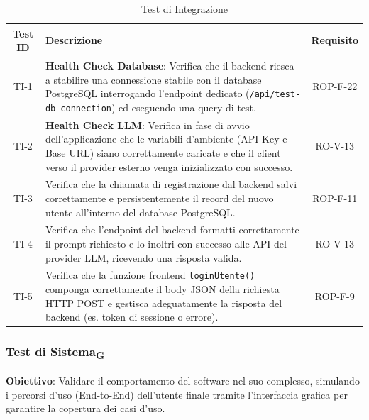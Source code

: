 \documentclass[11pt,a4paper]{article}
\begin{document}
\begin{table}[H]
    \centering
    \small
    \begin{tabularx}{\textwidth}{|c|X|c|}
        \hline
        \textbf{Test ID} & \textbf{Descrizione} & \textbf{Requisito} \\
        \hline
        TI-1 & \textbf{Health Check Database}: Verifica che il backend riesca a stabilire una connessione stabile con il database PostgreSQL interrogando l'endpoint dedicato (\texttt{/api/test-db-connection}) ed eseguendo una query di test. & ROP-F-22 \\
        \hline
        TI-2 & \textbf{Health Check LLM}: Verifica in fase di avvio dell'applicazione che le variabili d'ambiente (API Key e Base URL) siano correttamente caricate e che il client verso il provider esterno venga inizializzato con successo. & RO-V-13 \\
        \hline
        TI-3 & Verifica che la chiamata di registrazione dal backend salvi correttamente e persistentemente il record del nuovo utente all'interno del database PostgreSQL. & ROP-F-11 \\
        \hline
        TI-4 & Verifica che l'endpoint del backend formatti correttamente il prompt richiesto e lo inoltri con successo alle API del provider LLM, ricevendo una risposta valida. & RO-V-13 \\
        \hline
        TI-5 & Verifica che la funzione frontend \texttt{loginUtente()} componga correttamente il body JSON della richiesta HTTP POST e gestisca adeguatamente la risposta del backend (es. token di sessione o errore). & ROP-F-9 \\
        \hline
    \end{tabularx}
    \caption{Test di Integrazione}
\end{table}

\subsubsection{Test di Sistema\textsubscript{G}}
\textbf{Obiettivo}: Validare il comportamento del software nel suo complesso, simulando i percorsi d'uso (End-to-End) dell'utente finale tramite l'interfaccia grafica per garantire la copertura dei casi d'uso.
\end{document}
